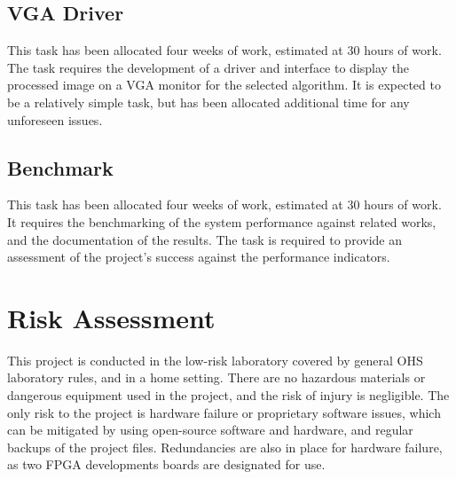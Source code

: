 \subsection{VGA Driver}
This task has been allocated four weeks of work, estimated at 30 hours of work.
The task requires the development of a driver and interface to display the processed image on a VGA monitor for the selected algorithm.
It is expected to be a relatively simple task, but has been allocated additional time for any unforeseen issues.

\subsection{Benchmark}
This task has been allocated four weeks of work, estimated at 30 hours of work.
It requires the benchmarking of the system performance against related works, and the documentation of the results.
The task is required to provide an assessment of the project's success against the performance indicators.


\section{Risk Assessment}
This project is conducted in the low-risk laboratory covered by general OHS laboratory rules, and in a home setting. 
There are no hazardous materials or dangerous equipment used in the project, and the risk of injury is negligible.
The only risk to the project is hardware failure or proprietary software issues, which can be mitigated by using open-source software and hardware, and regular backups of the project files.
Redundancies are also in place for hardware failure, as two FPGA developments boards are designated for use.